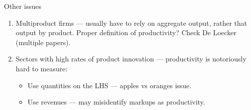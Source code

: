 \begin{frame}{Other issues}
\begin{enumerate}
	\item{Multiproduct firms --- usually have to rely on aggregate output, rather that output by product. Proper definition of productivity? Check De Loecker (multiple papers).}
	\item{Sectors with high rates of product innovation --- productivity is notoriously hard to measure:
		\begin{itemize}
			\item{Use quantities on the LHS --- apples vs oranges issue.}
			\item{Use revenues --- may misidentify markups as productivity.}
		\end{itemize}}
\end{enumerate}
\end{frame}